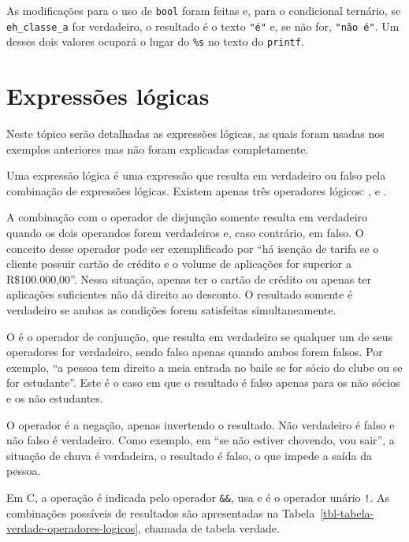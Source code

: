 \documentclass[
  11pt,
  a4paper,
]{scrbook}
\begin{document}
As modificações para o uso de \texttt{bool} foram feitas e, para o
condicional ternário, se \texttt{eh\_classe\_a} for verdadeiro, o
resultado é o texto \texttt{"é"} e, se não for, \texttt{"não\ é"}. Um
desses dois valores ocupará o lugar do \texttt{\%s} no texto do
\texttt{printf}.

\section{Expressões lógicas}\label{expressuxf5es-luxf3gicas}

Neste tópico serão detalhadas as expressões lógicas, as quais foram
usadas nos exemplos anteriores mas não foram explicadas completamente.

Uma expressão lógica é uma expressão que resulta em verdadeiro ou falso
pela combinação de expressões lógicas. Existem apenas três operadores
lógicos: {},
{} e
{}.

A combinação com o operador de disjunção
{} somente
resulta em verdadeiro quando os dois operandos forem verdadeiros e, caso
contrário, em falso. O conceito desse operador pode ser exemplificado
por ``há isenção de tarifa se o cliente possuir cartão de crédito e o
volume de aplicações for superior a R\$100.000,00''. Nessa situação,
apenas ter o cartão de crédito ou apenas ter aplicações suficientes não
dá direito ao desconto. O resultado somente é verdadeiro se ambas as
condições forem satisfeitas simultaneamente.

O {} é o
operador de conjunção, que resulta em verdadeiro se qualquer um de seus
operadores for verdadeiro, sendo falso apenas quando ambos forem falsos.
Por exemplo, ``a pessoa tem direito a meia entrada no baile se for sócio
do clube ou se for estudante''. Este é o caso em que o resultado é falso
apenas para os não sócios e os não estudantes.

O operador {} é
a negação, apenas invertendo o resultado. Não verdadeiro é falso e não
falso é verdadeiro. Como exemplo, em ``se não estiver chovendo, vou
sair'', a situação de chuva é verdadeira, o resultado é falso, o que
impede a saída da pessoa.

Em C, a operação
{} é indicada
pelo operador \texttt{\&\&},
{} usa
\texttt{\textbar{}\textbar{}} e
{} é o operador
unário \texttt{!}. As combinações possíveis de resultados são
apresentadas na Tabela~\ref{tbl-tabela-verdade-operadores-logicos},
chamada de tabela verdade.
\end{document}
